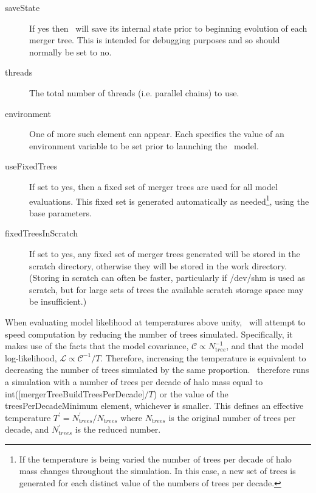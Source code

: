 \begin{description}
\item[{\normalfont \ttfamily saveState}] If {\normalfont \ttfamily yes} then \glc\ will save its internal state prior to beginning evolution of each merger tree. This is intended for debugging purposes and so should normally be set to {\normalfont \ttfamily no}.
\item[{\normalfont \ttfamily threads}] The total number of threads (i.e. parallel chains) to use.
\item[{\normalfont \ttfamily environment}] One of more such element can appear. Each specifies the value of an environment variable to be set prior to launching the \glc\ model.
\item[{\normalfont \ttfamily useFixedTrees}] If set to {\normalfont \ttfamily yes}, then a fixed set of merger trees are used for all model evaluations. This fixed set is generated automatically as needed\footnote{If the temperature is being varied the number of trees per decade of halo mass changes throughout the simulation. In this case, a new set of trees is generated for each distinct value of the numbers of trees per decade.}, using the base parameters.
\item[{\normalfont \ttfamily fixedTreesInScratch}] If set to {\normalfont \ttfamily yes}, any fixed set of merger trees generated will be stored in the scratch directory, otherwise they will be stored in the work directory. (Storing in scratch can often be faster, particularly if {\normalfont \ttfamily /dev/shm} is used as scratch, but for large sets of trees the available scratch storage space may be insufficient.)
\end{description}

When evaluating model likelihood at temperatures above unity, \glc\ will attempt to speed computation by reducing the number of trees simulated. Specifically, it makes use of the facts that the model covariance, $\mathcal{C} \propto N_{\mathrm tree}^{-1}$, and that the model log-likelihood, $\mathcal{L} \propto \mathcal{C}^{-1}/T$. Therefore, increasing the temperature is equivalent to decreasing the number of trees simulated by the same proportion. \glc\ therefore runs a simulation with a number of trees per decade of halo mass equal to {\normalfont \ttfamily int([mergerTreeBuildTreesPerDecade]}$/T${\normalfont \ttfamily )} or the value of the {\normalfont \ttfamily treesPerDecadeMinimum} element, whichever is smaller. This defines an effective temperature $T^\prime=N_{\mathrm trees}^\prime/N_{\mathrm trees}$ where $N_{\mathrm trees}$ is the original number of trees per decade, and $N_{\mathrm trees}^\prime$ is the reduced number.


